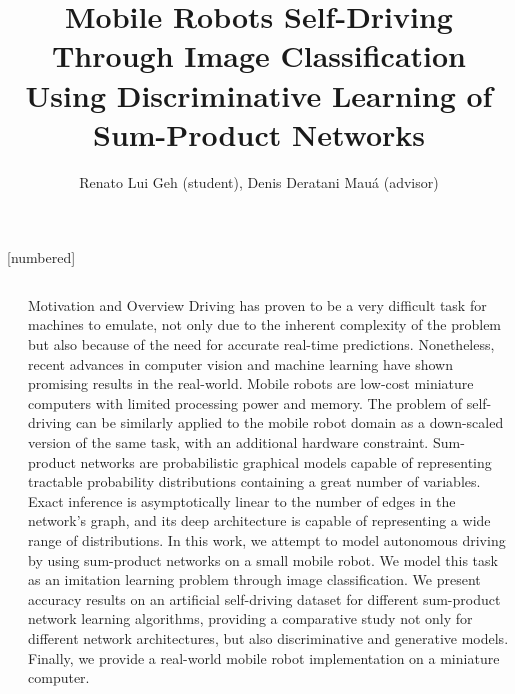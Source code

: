 \documentclass[final,hyperref={pdfpagelabels=false},notheorems]{beamer}
\title{\huge Mobile Robots Self-Driving Through Image Classification Using Discriminative Learning
of Sum-Product Networks}
\author{\Large Renato Lui Geh (student), Denis Deratani Mauá (advisor)}
\institute{\Large Institute of Mathematics and Statistics, University of São Paulo\\\vspace{4mm}
\texttt{\Large \{renatolg,ddm\}@ime.usp.br}}
\newcommand{\shrink}{-15pt}
\theoremstyle{thesisstyle}
\begin{document}
[numbered]

\begin{frame}[t]

\begin{columns}[t]
  \begin{column}{.008\textwidth}\end{column} %


  \begin{column}{.5\textwidth}

    \vspace{\shrink}
    \begin{block}{Motivation and Overview}
      Driving has proven to be a very difficult task for machines to emulate, not only due to the
      inherent complexity of the problem but also because of the need for accurate real-time
      predictions.  Nonetheless, recent advances in computer vision and machine learning have shown
      promising results in the real-world. Mobile robots are low-cost miniature computers with
      limited processing power and memory. The problem of self-driving can be similarly applied to
      the mobile robot domain as a down-scaled version of the same task, with an additional
      hardware constraint. Sum-product networks are probabilistic graphical models capable of
      representing tractable probability distributions containing a great number of variables.
      Exact inference is asymptotically linear to the number of edges in the network's graph, and
      its deep architecture is capable of representing a wide range of distributions. In this work,
      we attempt to model autonomous driving by using sum-product networks on a small mobile robot.
      We model this task as an imitation learning problem through image classification. We present
      accuracy results on an artificial self-driving dataset for different sum-product network
      learning algorithms, providing a comparative study not only for different network
      architectures, but also discriminative and generative models. Finally, we provide a
      real-world mobile robot implementation on a miniature computer.
    \end{block}


\end{column}
\end{columns}
\end{frame}
\end{document}

